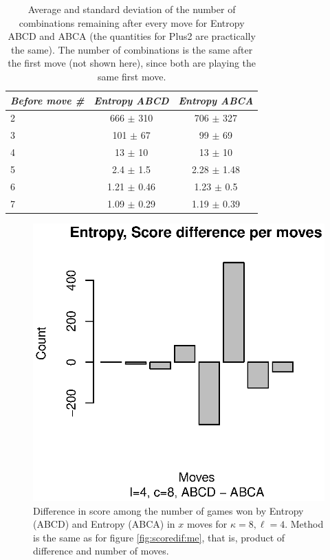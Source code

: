 \documentclass[preprint,12pt]{elsarticle}
\begin{document}
%
\begin{table}[!htb]
\centering
\caption{Average and standard deviation of the number of combinations
  remaining after every move for Entropy ABCD and ABCA (the quantities
  for Plus2 are practically the same). The number of combinations is the same after
  the  first move (not shown here), since both are playing the same
  first move.\label{tab:cset:abca:48}}
\smallskip
\begin{tabular}{|l|c|c|}
\hline
\emph{Before move \#} & \emph{Entropy ABCD} & \emph{Entropy ABCA} \\
\hline
2 & 666 $\pm$ 310 & 706 $\pm$ 327 \\
3 & 101 $\pm$ 67 & 99 $\pm$ 69 \\
4 & 13 $\pm$ 10 & 13 $\pm$ 10 \\ 
5 & 2.4 $\pm$ 1.5 & 2.28 $\pm$ 1.48 \\
6 & 1.21 $\pm$ 0.46 & 1.23 $\pm$ 0.5\\
7 & 1.09 $\pm$ 0.29 & 1.19 $\pm$ 0.39 \\
\hline
\end{tabular}
\end{table}
%
\begin{figure}[!htb]
\centering
\includegraphics{scoredif-abca-48.eps}
\caption{Difference in score among the number of games won by Entropy
  (ABCD) and Entropy (ABCA)  in $x$ moves for  $\kappa=8, \ell=4$. Method is the same as
  for figure \ref{fig:scoredif:me}, that is, product of difference and
  number of moves. \label{fig:scoredif:abca:48}}
\end{figure}
%
\end{document}
